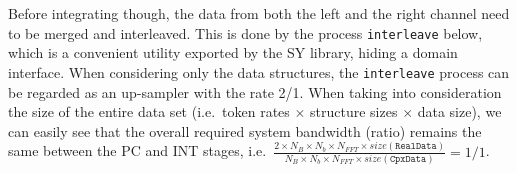 \documentclass[
  a4paper,
]{article}
\newenvironment{Shaded}{}{}
\newcommand{\DataTypeTok}[1]{\textcolor[rgb]{0.56,0.13,0.00}{#1}}
\newcommand{\FunctionTok}[1]{\textcolor[rgb]{0.02,0.16,0.49}{#1}}
\newcommand{\NormalTok}[1]{#1}
\newcommand{\OtherTok}[1]{\textcolor[rgb]{0.00,0.44,0.13}{#1}}
\begin{document}
\begin{Shaded}
\end{Shaded}

Before integrating though, the data from both the left and the right
channel need to be merged and interleaved. This is done by the process
\texttt{interleave} below, which is a convenient utility exported by the
SY library, hiding a domain interface. When considering only the data
structures, the \texttt{interleave} process can be regarded as an
up-sampler with the rate 2/1. When taking into consideration the size of
the entire data set (i.e.~token rates \(\times\) structure sizes
\(\times\) data size), we can easily see that the overall required
system bandwidth (ratio) remains the same between the PC and INT stages,
i.e.~\(\frac{2\times N_B \times N_{b} \times N_{FFT}\times \mathit{size}(\mathtt{RealData})}{N_B \times N_{b} \times N_{FFT}\times \mathit{size}(\mathtt{CpxData})}=1/1\).
\end{document}
